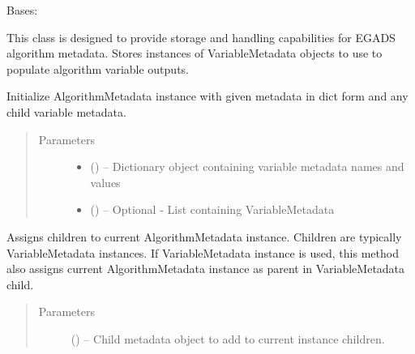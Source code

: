\documentclass[a4paper,10pt,openany,english]{sphinxmanual}
\begin{document}
\begin{fulllineitems}
\begin{fulllineitems}
\begin{quote}
\begin{description}
\end{description}\end{quote}

\end{fulllineitems}


\end{fulllineitems}


\begin{fulllineitems}
\label{egadsapi:egads.core.metadata.AlgorithmMetadata}
Bases: {\hyperref[egadsapi:egads.core.metadata.Metadata]{}}

This class is designed to provide storage and handling capabilities for 
EGADS algorithm metadata. Stores instances of VariableMetadata objects
to use to populate algorithm variable outputs.

Initialize AlgorithmMetadata instance with given metadata in dict form and
any child variable metadata.
\begin{quote}\begin{description}
\item[{Parameters}] \leavevmode\begin{itemize}
\item {} 
 () -- Dictionary object containing variable metadata names and values

\item {} 
 () -- Optional -
List containing VariableMetadata

\end{itemize}

\end{description}\end{quote}

\begin{fulllineitems}
\label{egadsapi:egads.core.metadata.AlgorithmMetadata.assign_children}
Assigns children to current AlgorithmMetadata instance. Children are
typically VariableMetadata instances. If VariableMetadata instance is
used, this method also assigns current AlgorithmMetadata instance
as parent in VariableMetadata child.
\begin{quote}\begin{description}
\item[{Parameters}] \leavevmode
{} ({\hyperref[egadsapi:egads.core.metadata.VariableMetadata]{}}) -- Child metadata object to add to current instance children.


\end{description}
\end{quote}
\end{fulllineitems}
\end{fulllineitems}
\end{document}

